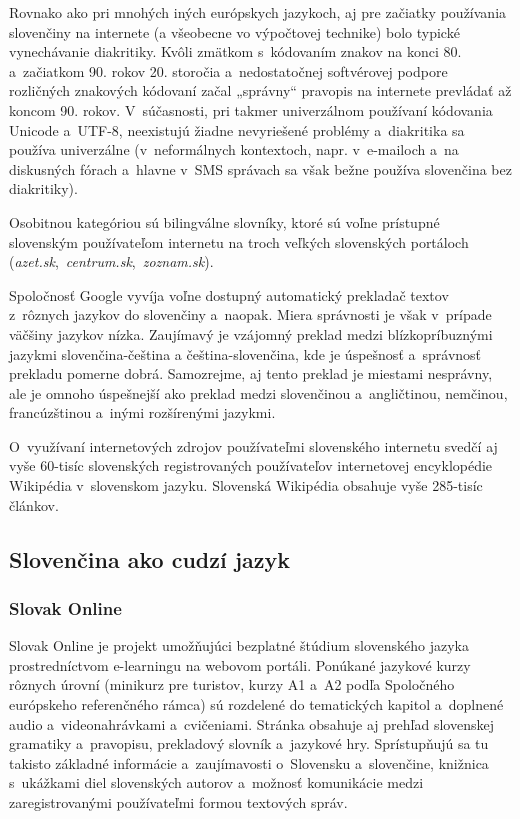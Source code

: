 \begin{multicols}{2}
Rovnako ako pri mnohých iných európskych jazykoch, aj pre začiatky
používania slovenčiny na internete (a všeobecne vo výpočtovej technike) bolo typické vynechávanie diakritiky. Kvôli
zmätkom s~kódovaním znakov na konci 80. a~začiatkom 90. rokov 20.
storočia a~nedostatočnej softvérovej podpore rozličných znakových
kódovaní začal „správny“ pravopis na internete prevládať až
koncom 90. rokov. V~súčasnosti, pri takmer univerzálnom používaní
kódovania Unicode a~UTF-8, neexistujú žiadne nevyriešené problémy
a~diakritika sa používa univerzálne (v~neformálnych kontextoch,
napr. v~e-mailoch a~na diskusných fórach a~hlavne v~SMS správach
sa však bežne používa slovenčina bez diakritiky).

Osobitnou kategóriou sú bilingválne slovníky, ktoré sú voľne
prístupné slovenským používateľom internetu na troch veľkých
slovenských portáloch (\emph{azet.sk},~\emph{centrum.sk},~\emph{zoznam.sk}).

Spoločnosť Google vyvíja voľne dostupný automatický prekladač
textov z~rôznych jazykov do slovenčiny a~naopak. Miera správnosti je
však v~prípade väčšiny jazykov nízka. Zaujímavý je vzájomný
preklad medzi blízkopríbuznými jazykmi slovenčina-čeština a
čeština-slovenčina, kde je úspešnosť a~správnosť prekladu
pomerne dobrá. Samozrejme, aj tento preklad je miestami nesprávny, ale je
omnoho úspešnejší ako preklad medzi slovenčinou a~angličtinou,
nemčinou, francúzštinou a~inými rozšírenými jazykmi.

O~využívaní internetových zdrojov používateľmi slovenského
internetu svedčí aj vyše 60-tisíc slovenských registrovaných
používateľov internetovej encyklopédie Wikipédia v~slovenskom
jazyku. Slovenská Wikipédia obsahuje vyše 285-tisíc
článkov.

\subsection{Slovenčina ako cudzí jazyk}
\subsubsection{Slovak Online}
Slovak Online\cite{f6} je projekt umožňujúci bezplatné štúdium
slovenského jazyka prostredníctvom e-learningu na webovom portáli. Ponúkané jazykové
kurzy rôznych úrovní (minikurz pre turistov, kurzy A1 a~A2 podľa
Spoločného európskeho referenčného rámca) sú rozdelené do
tematických kapitol a~doplnené audio a~videonahrávkami a~cvičeniami.
Stránka obsahuje aj prehľad slovenskej gramatiky a~pravopisu,
prekladový slovník a~jazykové hry. Sprístupňujú sa tu takisto základné
informácie a~zaujímavosti o~Slovensku a~slovenčine, knižnica
s~ukážkami diel slovenských autorov a~možnosť komunikácie medzi
zaregistrovanými používateľmi formou textových správ.


\end{multicols}
